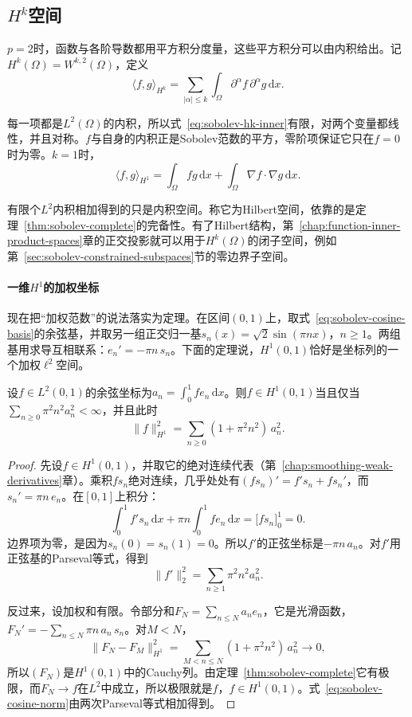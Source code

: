 \subsection{\texorpdfstring{$H^k$}{Hk}空间}
\label{sec:sobolev-hk}

$p=2$时，函数与各阶导数都用平方积分度量，这些平方积分可以由内积给出。记$H^k(\Omega)=W^{k,2}(\Omega)$，定义
\begin{equation}
\langle f,g\rangle_{H^k}=\sum_{|\alpha|\leq k}\int_\Omega\partial^\alpha f\,\partial^\alpha g\,\mathrm dx .
\label{eq:sobolev-hk-inner}
\end{equation}

每一项都是$L^2(\Omega)$的内积，所以式~\eqref{eq:sobolev-hk-inner}有限，对两个变量都线性，并且对称。$f$与自身的内积正是Sobolev范数的平方，零阶项保证它只在$f=0$时为零。$k=1$时，
\[
\langle f,g\rangle_{H^1}=\int_\Omega fg\,\mathrm dx+\int_\Omega\nabla f\cdot\nabla g\,\mathrm dx .
\]

有限个$L^2$内积相加得到的只是内积空间。称它为Hilbert空间，依靠的是定理~\ref{thm:sobolev-complete}的完备性。有了Hilbert结构，第~\ref{chap:function-inner-product-spaces}章的正交投影就可以用于$H^k(\Omega)$的闭子空间，例如第~\ref{sec:sobolev-constrained-subspaces}节的零边界子空间。

\paragraph{一维$H^1$的加权坐标}
现在把“加权范数”的说法落实为定理。在区间$(0,1)$上，取式~\eqref{eq:sobolev-cosine-basis}的余弦基，并取另一组正交归一基$s_n(x)=\sqrt2\sin(\pi nx)$，$n\geq1$。两组基用求导互相联系：$e_n'=-\pi n\,s_n$。下面的定理说，$H^1(0,1)$恰好是坐标列的一个加权$\ell^2$空间。

\begin{theorem}[$H^1(0,1)$的余弦坐标]
\label{thm:sobolev-cosine-coordinates}
设$f\in L^2(0,1)$的余弦坐标为$a_n=\int_0^1fe_n\,\mathrm dx$。则$f\in H^1(0,1)$当且仅当$\sum_{n\geq0}\pi^2n^2a_n^2<\infty$，并且此时
\begin{equation}
\lVert f\rVert_{H^1}^2=\sum_{n\geq0}(1+\pi^2n^2)\,a_n^2 .
\label{eq:sobolev-cosine-norm}
\end{equation}
\end{theorem}

\begin{proof}
先设$f\in H^1(0,1)$，并取它的绝对连续代表（第~\ref{chap:smoothing-weak-derivatives}章）。乘积$fs_n$绝对连续，几乎处处有$(fs_n)'=f's_n+fs_n'$，而$s_n'=\pi n\,e_n$。在$[0,1]$上积分：
\[
\int_0^1f's_n\,\mathrm dx+\pi n\int_0^1fe_n\,\mathrm dx
=\bigl[fs_n\bigr]_0^1=0 .
\]
边界项为零，是因为$s_n(0)=s_n(1)=0$。所以$f'$的正弦坐标是$-\pi n\,a_n$。对$f'$用正弦基的Parseval等式，得到
\[
\lVert f'\rVert_2^2=\sum_{n\geq1}\pi^2n^2a_n^2 .
\]

反过来，设加权和有限。令部分和$F_N=\sum_{n\leq N}a_ne_n$，它是光滑函数，$F_N'=-\sum_{n\leq N}\pi n\,a_n\,s_n$。对$M<N$，
\[
\lVert F_N-F_M\rVert_{H^1}^2=\sum_{M<n\leq N}(1+\pi^2n^2)\,a_n^2\to0,
\]
所以$(F_N)$是$H^1(0,1)$中的Cauchy列。由定理~\ref{thm:sobolev-complete}它有极限，而$F_N\to f$在$L^2$中成立，所以极限就是$f$，$f\in H^1(0,1)$。式~\eqref{eq:sobolev-cosine-norm}由两次Parseval等式相加得到。
\end{proof}

